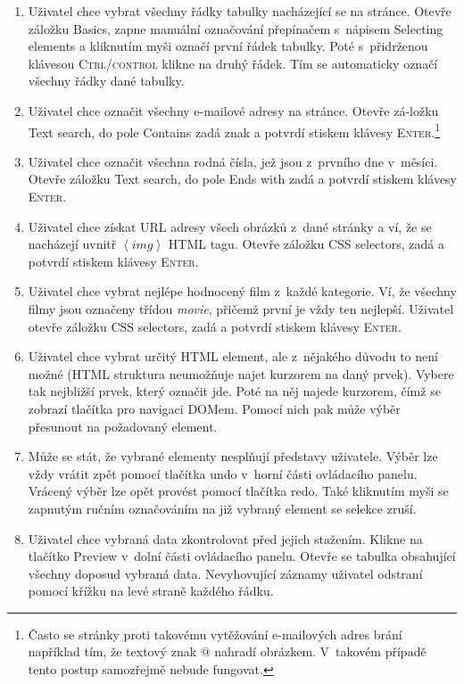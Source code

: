 \documentclass[thesis=B,czech]{FITthesis}[2012/06/26]
\begin{document}
\begin{enumerate}
	\item Uživatel chce vybrat všechny řádky tabulky nacházející se na stránce. Otevře záložku \textsf{Basics}, zapne manuální označování přepínačem s~nápisem \textsf{Selecting elements} a kliknutím myši označí první řádek tabulky. Poté s~přidrženou klávesou \textsc{Ctrl/control} klikne na druhý řádek. Tím se automaticky označí všechny řádky dané tabulky.
	\item Uživatel chce označit všechny e-mailové adresy na stránce. Otevře zá-ložku \textsf{Text search}, do pole \textsf{Contains} zadá znak  a potvrdí stiskem klávesy \textsc{Enter}.\footnote{Často se stránky proti takovému vytěžování e-mailových adres brání například tím, že textový znak @ nahradí obrázkem. V~takovém případě tento postup samozřejmě nebude fungovat.}
	\item Uživatel chce označit všechna rodná čísla, jež jsou z~prvního dne v~měsíci. Otevře záložku \textsf{Text search}, do pole \textsf{Ends with} zadá  a potvrdí stiskem klávesy \textsc{Enter}.
	\item Uživatel chce získat URL adresy všech obrázků z~dané stránky a ví, že se nacházejí uvnitř $\left<img\right>$ HTML tagu. Otevře záložku \textsf{CSS selectors}, zadá  a potvrdí stiskem klávesy \textsc{Enter}.
	\item Uživatel chce vybrat nejlépe hodnocený film z~každé kategorie. Ví, že všechny filmy jsou označeny třídou \textit{movie}, přičemž první je vždy ten nejlepší. Uživatel otevře záložku \textsf{CSS selectors}, zadá  a potvrdí stiskem klávesy \textsc{Enter}.
	\item Uživatel chce vybrat určitý HTML element, ale z~nějakého důvodu to není možné (HTML struktura neumožňuje najet kurzorem na daný prvek). Vybere tak nejbližší prvek, který označit jde. Poté na něj najede kurzorem, čímž se zobrazí tlačítka pro navigaci DOMem. Pomocí nich pak může výběr přesunout na požadovaný element.
	\item Může se stát, že vybrané elementy nesplňují představy uživatele. Výběr lze vždy vrátit zpět pomocí tlačítka \textsf{undo} v~horní části ovládacího panelu. Vrácený výběr lze opět provést pomocí tlačítka \textsf{redo}. Také kliknutím myši se zapnutým ručním označováním na již vybraný element se selekce zruší.
	\item Uživatel chce vybraná data zkontrolovat před jejich stažením. Klikne na tlačítko \textsf{Preview} v~dolní části ovládacího panelu. Otevře se tabulka obsahující všechny doposud vybraná data. Nevyhovující záznamy uživatel odstraní pomocí křížku na levé straně každého řádku.
\end{enumerate}
\end{document}
